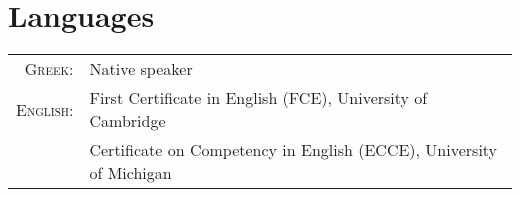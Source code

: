 \documentclass[a4paper]{Classes/cv_prof_en} %
\begin{document}

\section{Languages}
\begin{tabular}{rl}
\textsc{Greek:} & Native speaker\\
\textsc{English:}& First Certificate in English (FCE), University of Cambridge\\
				& Certificate on Competency in English (ECCE), University of Michigan\\
\end{tabular}

\end{document}
